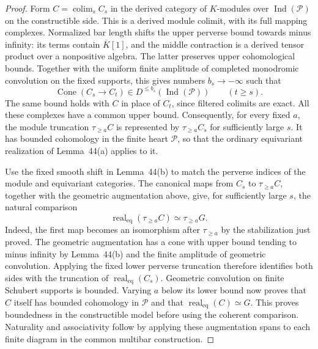 \documentclass[11pt]{article}
\numberwithin{equation}{section}
\theoremstyle{definition}
\theoremstyle{remark}
\begin{document}
\begin{proof}
Form $C=\operatorname*{colim}_s C_s$ in the derived category of
$K$-modules over $\operatorname{Ind}(\mathcal P)$ on the
constructible side.  This is a derived module colimit, with its
full mapping complexes.  Normalized bar length shifts the upper
perverse bound towards minus infinity: its terms contain
$\overline K[1]$, and the middle contraction is a derived tensor
product over a nonpositive algebra.  The latter preserves upper
cohomological bounds.  Together with the uniform finite amplitude
of completed monodromic convolution on the fixed supports, this
gives numbers $b_s\to-\infty$ such that
\[
 \operatorname{Cone}(C_s\longrightarrow C_t)
   \in D^{\leq b_s}(\operatorname{Ind}(\mathcal P))
 \qquad(t\geq s).
\]
The same bound holds with $C$ in place of $C_t$, since filtered
colimits are exact.  All these complexes have a common upper bound.
Consequently, for every fixed $a$, the module truncation
$\tau_{\geq a}C$ is represented by
$\tau_{\geq a}C_s$ for sufficiently large $s$.  It has bounded
cohomology in the finite heart $\mathcal P$, so that the ordinary
equivariant realization of Lemma~44(a) applies to it.

Use the fixed smooth shift in Lemma~44(b) to match the perverse
indices of the module and equivariant categories.  The canonical
maps from $C_s$ to $\tau_{\geq a}C$, together with the geometric
augmentation above, give, for sufficiently large $s$, the natural
comparison
\[
 \operatorname{real}_{\mathrm{eq}}(\tau_{\geq a}C)
       \simeq \tau_{\geq a}G.
\]
Indeed, the first map becomes an isomorphism after
$\tau_{\geq a}$ by the stabilization just proved.  The geometric
augmentation has a cone with upper bound tending to minus infinity
by Lemma~44(b) and the finite amplitude of geometric convolution.  Applying the fixed lower perverse truncation therefore
identifies both sides with the truncation of
$\operatorname{real}_{\mathrm{eq}}(C_s)$.
Geometric convolution on finite Schubert supports is bounded.
Varying $a$ below its lower bound now proves that $C$ itself has
bounded cohomology in $\mathcal P$ and that
$\operatorname{real}_{\mathrm{eq}}(C)\simeq G$.
This proves boundedness in the constructible model before using
the coherent comparison.  Naturality and associativity follow by
applying these augmentation spans to each finite diagram in the
common multibar construction.


\end{proof}
\end{document}
